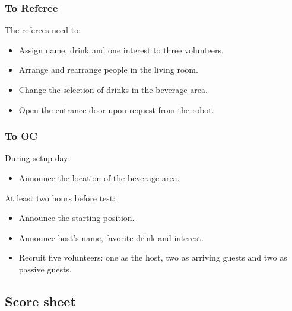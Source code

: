 \subsubsection*{To Referee}

The referees need to:
\begin{itemize}
	\item Assign name, drink and one interest to three volunteers.
	\item Arrange and rearrange people in the living room.
	\item Change the selection of drinks in the beverage area.
	\item Open the entrance door upon request from the robot.
\end{itemize}

\subsubsection*{To OC}


During setup day:
\begin{itemize}
	\item Announce the location of the beverage area.
\end{itemize}


At least two hours before test:
\begin{itemize}
	\item Announce the starting position.
	\item Announce host's name, favorite drink and interest.
	\item Recruit five volunteers: one as the host, two as arriving guests and two as passive guests.

\end{itemize}

\subsection*{Score sheet}
